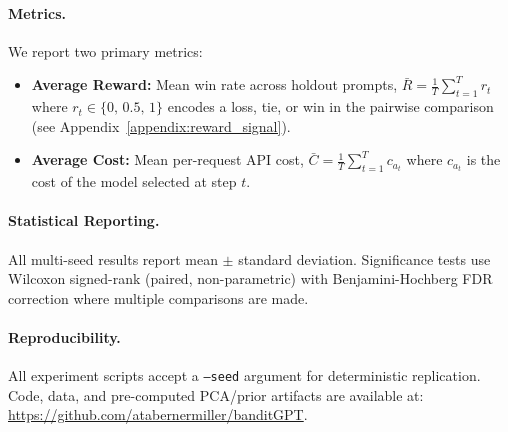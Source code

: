 \paragraph{Metrics.}
We report two primary metrics:
\begin{itemize}[leftmargin=*,noitemsep]
    \item \textbf{Average Reward:} Mean win rate across holdout prompts, $\bar{R} = \frac{1}{T}\sum_{t=1}^{T} r_t$ where $r_t \in \{0,\, 0.5,\, 1\}$ encodes a loss, tie, or win in the pairwise comparison (see Appendix~\ref{appendix:reward_signal}).
    \item \textbf{Average Cost:} Mean per-request API cost, $\bar{C} = \frac{1}{T}\sum_{t=1}^{T} c_{a_t}$ where $c_{a_t}$ is the cost of the model selected at step $t$.
\end{itemize}

\paragraph{Statistical Reporting.}
All multi-seed results report mean $\pm$ standard deviation.
Significance tests use Wilcoxon signed-rank (paired, non-parametric) with Benjamini-Hochberg FDR correction where multiple comparisons are made.

\paragraph{Reproducibility.}
All experiment scripts accept a \texttt{--seed} argument for deterministic replication.
Code, data, and pre-computed PCA/prior artifacts are available at: \url{https://github.com/atabernermiller/banditGPT}.
